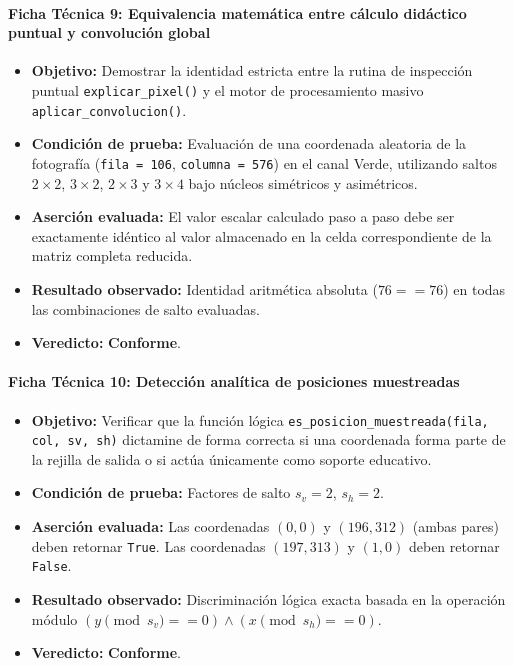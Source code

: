 \documentclass[11pt]{article}
\newcommand{\pruebaok}{\textcolor{verdeExito}{\textbf{Conforme}}}
\begin{document}
\paragraph{Ficha Técnica 9: Equivalencia matemática entre cálculo didáctico puntual y convolución global}
\begin{itemize}[itemsep=0.15em]
\item \textbf{Objetivo:} Demostrar la identidad estricta entre la rutina de inspección puntual \texttt{explicar\_pixel()} y el motor de procesamiento masivo \texttt{aplicar\_convolucion()}.
\item \textbf{Condición de prueba:} Evaluación de una coordenada aleatoria de la fotografía (\texttt{fila = 106}, \texttt{columna = 576}) en el canal Verde, utilizando saltos $2\times2$, $3\times2$, $2\times3$ y $3\times4$ bajo núcleos simétricos y asimétricos.
\item \textbf{Aserción evaluada:} El valor escalar calculado paso a paso debe ser exactamente idéntico al valor almacenado en la celda correspondiente de la matriz completa reducida.
\item \textbf{Resultado observado:} Identidad aritmética absoluta ($76 == 76$) en todas las combinaciones de salto evaluadas.
\item \textbf{Veredicto:} \pruebaok.
\end{itemize}

\paragraph{Ficha Técnica 10: Detección analítica de posiciones muestreadas}
\begin{itemize}[itemsep=0.15em]
\item \textbf{Objetivo:} Verificar que la función lógica \texttt{es\_posicion\_muestreada(fila, col, sv, sh)} dictamine de forma correcta si una coordenada forma parte de la rejilla de salida o si actúa únicamente como soporte educativo.
\item \textbf{Condición de prueba:} Factores de salto $s_v = 2$, $s_h = 2$.
\item \textbf{Aserción evaluada:} Las coordenadas $(0, 0)$ y $(196, 312)$ (ambas pares) deben retornar \texttt{True}. Las coordenadas $(197, 313)$ y $(1, 0)$ deben retornar \texttt{False}.
\item \textbf{Resultado observado:} Discriminación lógica exacta basada en la operación módulo $(y \pmod{s_v} == 0) \land (x \pmod{s_h} == 0)$.
\item \textbf{Veredicto:} \pruebaok.
\end{itemize}
\end{document}
